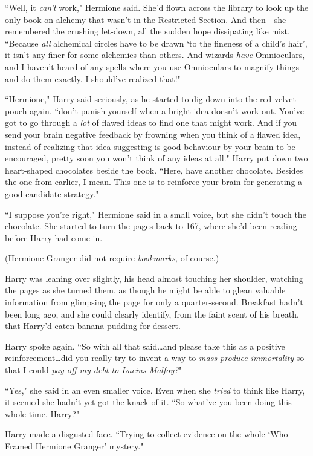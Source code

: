 ``Well, it \emph{can't} work," Hermione said. She'd flown across the library to look up the only book on alchemy that wasn't in the Restricted Section. And then—she remembered the crushing let-down, all the sudden hope dissipating like mist. ``Because \emph{all} alchemical circles have to be drawn `to the fineness of a child's hair', it isn't any finer for some alchemies than others. And wizards \emph{have} Omnioculars, and I haven't heard of any spells where you use Omnioculars to magnify things and do them exactly. I should've realized that!"

``Hermione," Harry said seriously, as he started to dig down into the red-velvet pouch again, ``don't punish yourself when a bright idea doesn't work out. You've got to go through a \emph{lot} of flawed ideas to find one that might work. And if you send your brain negative feedback by frowning when you think of a flawed idea, instead of realizing that idea-suggesting is good behaviour by your brain to be encouraged, pretty soon you won't think of any ideas at all." Harry put down two heart-shaped chocolates beside the book. ``Here, have another chocolate. Besides the one from earlier, I mean. This one is to reinforce your brain for generating a good candidate strategy."

``I suppose you're right," Hermione said in a small voice, but she didn't touch the chocolate. She started to turn the pages back to 167, where she'd been reading before Harry had come in.

(Hermione Granger did not require \emph{bookmarks}, of course.)

Harry was leaning over slightly, his head almost touching her shoulder, watching the pages as she turned them, as though he might be able to glean valuable information from glimpsing the page for only a quarter-second. Breakfast hadn't been long ago, and she could clearly identify, from the faint scent of his breath, that Harry'd eaten banana pudding for dessert.

Harry spoke again. ``So with all that said…and please take this as a positive reinforcement…did you really try to invent a way to \emph{mass-produce immortality} so that I could \emph{pay off my debt to Lucius Malfoy?}"

``Yes," she said in an even smaller voice. Even when she \emph{tried} to think like Harry, it seemed she hadn't yet got the knack of it. ``So what've you been doing this whole time, Harry?"

Harry made a disgusted face. ``Trying to collect evidence on the whole `Who Framed Hermione Granger' mystery."

